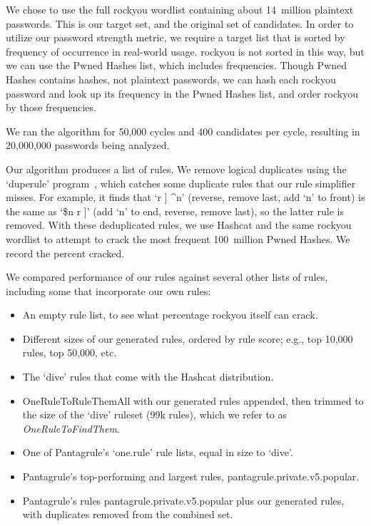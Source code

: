 \documentclass[letterpaper,twocolumn,10pt]{article}
\begin{document}
We chose to use the full rockyou wordlist containing about 14~million plaintext
passwords. This is our target set, and the original set of candidates. In order
to utilize our password strength metric, we require a target list that is
sorted by frequency of occurrence in real-world usage. rockyou is not sorted in
this way, but we can use the Pwned Hashes list, which includes frequencies.
Though Pwned Hashes contains hashes, not plaintext passwords, we can hash each
rockyou password and look up its frequency in the Pwned Hashes list, and order
rockyou by those frequencies.

We ran the algorithm for 50,000 cycles and 400 candidates per cycle, resulting
in 20,000,000 passwords being analyzed.

Our algorithm produces a list of rules. We remove logical duplicates using the `duperule' program~\cite{duprule}, which catches some duplicate rules that our rule simplifier misses. For example, it finds that `r ] \^{}n' (reverse, remove last, add `n' to front) is the same as `\$n r ]' (add `n' to end, reverse, remove last), so the latter rule is removed. With these deduplicated rules, we use Hashcat and the same rockyou wordlist to attempt to crack the most frequent 100~million Pwned Hashes. We record the percent cracked.

We compared performance of our rules against several other lists of rules,
including some that incorporate our own rules:

\begin{itemize}
\item An empty rule list, to see what percentage rockyou itself can crack.
\item Different sizes of our generated rules, ordered by rule score; e.g., top
10,000 rules, top 50,000, etc.
\item The `dive' rules that come with the Hashcat distribution.
\item OneRuleToRuleThemAll with our generated rules appended, then trimmed to the size of the `dive' ruleset (99k rules), which we refer to as \textit{OneRuleToFindThem}.
\item One of Pantagrule's `one.rule' rule lists, equal in size to `dive'.
\item Pantagrule's top-performing and largest rules, pantagrule.private.v5.popular.
\item Pantagrule's rules pantagrule.private.v5.popular plus our generated rules, with duplicates removed from the combined set.
\end{itemize}
\end{document}
